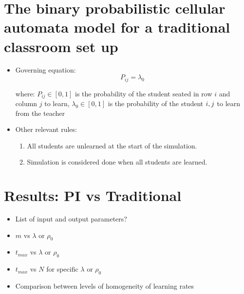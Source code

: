 \section{The binary probabilistic cellular automata model for a traditional classroom set up}
\begin{itemize}
    \item Governing equation:
    \begin{equation}
    \label{eq:BPCA traditional learning probability}
        P_{ij} = \lambda_0
    \end{equation}

    where:
    \subitem $P_{ij} \in [0,1]$ is the probability of the student seated in row $i$ and column $j$ to learn,
    \subitem $\lambda_0 \in [0,1]$ is the probability of the student $i,\space j$ to learn from the teacher

    \item Other relevant rules:
    \begin{enumerate}
        \item All students are unlearned at the start of the simulation.
        \item Simulation is considered done when all students are learned.
    \end{enumerate}
\end{itemize}

\section{Results: PI vs Traditional}
\begin{itemize}
    \item List of input and output parameters?
    \item $m$ vs $\lambda$ or $\rho_0$
    \item $t_{max}$ vs $\lambda$ or $\rho_0$
    \item $t_{max}$ vs $N$ for specific $\lambda$ or $\rho_0$
    \item Comparison between levels of homogeneity of learning rates
\end{itemize}

